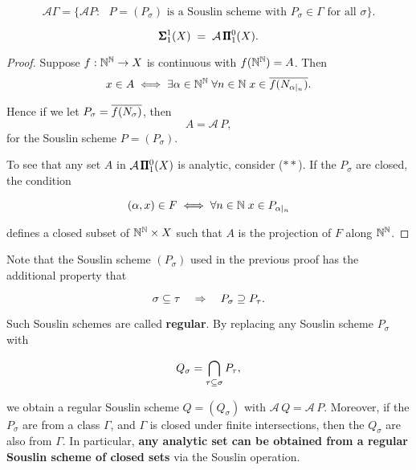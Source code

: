 \begin{equation}
\mathcal{A}\Gamma = \{\mathcal{A}P \colon \text{ $P = (P_\sigma)$ is a Souslin scheme with $P_\sigma \in \Gamma$ for all $\sigma$} \}.
\end{equation}

\begin{theorem}\label{analytic-souslin-op}\begin{equation}
\pmb{\Sigma}^{1}_{1}(X)\; = \; \mathcal{A}\,\pmb{\Pi}^0_{1}(X).
\end{equation}

\end{theorem}\begin{proof}Suppose $f: \mathbb{N}^{\mathbb{N}} \to X$ is continuous with $f(\mathbb{N}^{\mathbb{N}}) = A$. Then
\begin{equation*}
x \in A \iff \exists \alpha  \in \mathbb{N}^{\mathbb{N}} \; \forall n \in \mathbb{N} \; x \in \overline{f(N_{\alpha\mid_{n}})}.
\end{equation*}

Hence if we let $P_\sigma = \overline{f(N_{\sigma})}$, then
\begin{equation*}
A =  \mathcal{A} \,P,
\end{equation*}
for the Souslin scheme $P = (P_\sigma)$.

To see that any set $A$ in $\mathcal{A}\,\pmb{\Pi}^0_{1}(X)$ is analytic, consider ($**$). If the $P_\sigma$ are closed, the condition

\begin{equation}
(\alpha,x) \in F \iff \forall n \in \mathbb{N} \; x \in P_{\alpha\mid_{n}}
\end{equation}

defines a closed subset of $\mathbb{N}^{\mathbb{N}} \times X$ such that $A$ is the projection of $F$ along $\mathbb{N}^{\mathbb{N}}$.

\end{proof}Note that the Souslin scheme $(P_\sigma)$ used in the previous proof has the additional property that

\begin{equation}
\sigma \subseteq \tau \quad \Rightarrow \quad P_\sigma \supseteq P_\tau.
\end{equation}

Such Souslin schemes are called \textbf{regular}. By replacing any Souslin scheme $P_\sigma$ with

\begin{equation}
Q_\sigma = \bigcap_{\tau \subseteq \sigma} P_\tau,
\end{equation}

we obtain a regular Souslin scheme $Q = (Q_\sigma)$ with $\mathcal{A} \, Q = \mathcal{A}\, P$. Moreover, if the $P_\sigma$ are from a class $\Gamma$, and $\Gamma$ is closed under finite intersections, then the $Q_\sigma$ are also from $\Gamma$. In particular, \textbf{any analytic set can be obtained from a regular Souslin scheme of closed sets} via the Souslin operation.